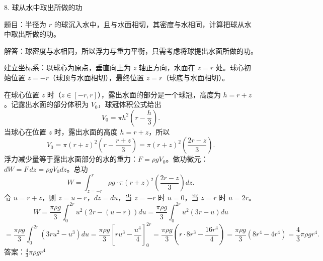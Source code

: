 8. 球从水中取出所做的功

题目：半径为 \(r\) 的球沉入水中，且与水面相切，其密度与水相同，计算把球从水中取出所做的功。

解答：球密度与水相同，所以浮力与重力平衡，只需考虑将球提出水面所做的功。

建立坐标系：以球心为原点，垂直向上为 \(z\) 轴正方向，水面在 \(z=r\) 处。球心初始位置 \(z=-r\)（球顶与水面相切），最终位置 \(z=r\)（球底与水面相切）。

在球心位置 \(z\) 时（\(z\in[-r,r]\)），露出水面的部分是一个球冠，高度为 \(h=r+z\)。记露出水面的部分体积为 \(V_{0}\)，球冠体积公式给出
\[ V_{0}=\pi h^{2}\left(r-\frac{h}{3}\right). \]
当球心在位置 \(z\) 时，露出水面的高度 \(h=r+z\)，所以
\[ V_{0}=\pi(r+z)^{2}\left(r-\frac{r+z}{3}\right)=\pi(r+z)^{2}\left(\frac{2r-z}{3}\right). \]
浮力减少量等于露出水面部分的水的重力：\(F=\rho gV_{0}\)。做功微元：\(dW=F\,dz=\rho gV_{0}dz\)。总功
\[ W=\int_{z=-r}^{r}\rho g\cdot\pi(r+z)^{2}\left(\frac{2r-z}{3}\right)dz. \]
令 \(u=r+z\)，则 \(z=u-r\)，\(dz=du\)，当 \(z=-r\) 时 \(u=0\)，当 \(z=r\) 时 \(u=2r\)。
\[ W=\frac{\pi\rho g}{3}\int_{0}^{2r}u^{2}\left(2r-(u-r)\right)du=\frac{\pi\rho g}{3}\int_{0}^{2r}u^{2}(3r-u)du \]
\[ =\frac{\pi\rho g}{3}\int_{0}^{2r}(3ru^{2}-u^{3})du=\frac{\pi\rho g}{3}\left[ru^{3}-\frac{u^{4}}{4}\right]_{0}^{2r}=\frac{\pi\rho g}{3}\left(r\cdot8r^{3}-\frac{16r^{4}}{4}\right)=\frac{\pi\rho g}{3}\left(8r^{4}-4r^{4}\right)=\frac{4}{3}\pi\rho gr^{4}. \]
答案：\(\frac{4}{3}\pi\rho gr^{4}\)

